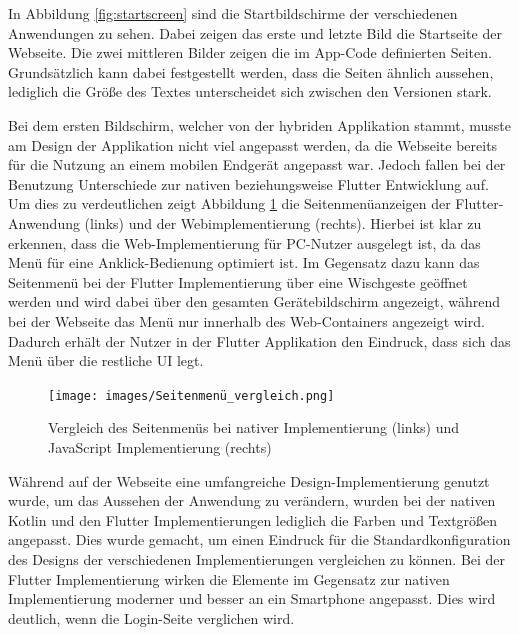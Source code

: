 In Abbildung \ref{fig:startscreen} sind die Startbildschirme der verschiedenen Anwendungen zu sehen. Dabei zeigen das erste und letzte Bild die Startseite der Webseite. Die zwei mittleren Bilder zeigen die im App-Code definierten Seiten. Grundsätzlich kann dabei festgestellt werden, dass die Seiten ähnlich aussehen, lediglich die Größe des Textes unterscheidet sich zwischen den Versionen stark.

Bei dem ersten Bildschirm, welcher von der hybriden Applikation stammt, musste am Design der Applikation nicht viel angepasst werden, da die Webseite bereits für die Nutzung an einem mobilen Endgerät angepasst war. Jedoch fallen bei der Benutzung Unterschiede zur nativen beziehungsweise Flutter Entwicklung auf. 
Um dies zu verdeutlichen zeigt Abbildung \ref{fig:sidemenu} die Seitenmenüanzeigen der Flutter-Anwendung (links) und der Webimplementierung (rechts). Hierbei ist klar zu erkennen, dass die Web-Implementierung für PC-Nutzer ausgelegt ist, da das Menü für eine Anklick-Bedienung optimiert ist. 
Im Gegensatz dazu kann das Seitenmenü bei der Flutter Implementierung über eine Wischgeste geöffnet werden und wird dabei über den gesamten Gerätebildschirm angezeigt, während bei der Webseite das Menü nur innerhalb des Web-Containers angezeigt wird. Dadurch erhält der Nutzer in der Flutter Applikation den Eindruck, dass sich das Menü über die restliche UI legt. 
\begin{figure}[ht]
  \centering
  \texttt{[image: images/Seitenmenü\_vergleich.png]} 
  \caption[Vergleich des Seitenmenüs der nativen und hybriden Applikation]{Vergleich des Seitenmenüs bei nativer Implementierung (links) und JavaScript Implementierung (rechts)}
  \label{fig:sidemenu}
\end{figure}

Während auf der Webseite eine umfangreiche Design-Implementierung genutzt wurde, um das Aussehen der Anwendung zu verändern, wurden bei der nativen Kotlin und den Flutter Implementierungen lediglich die Farben und Textgrößen angepasst. Dies wurde gemacht, um einen Eindruck für die Standardkonfiguration des Designs der verschiedenen Implementierungen vergleichen zu können. Bei der Flutter Implementierung wirken die Elemente im Gegensatz zur nativen Implementierung moderner und besser an ein Smartphone angepasst. Dies wird deutlich, wenn die Login-Seite verglichen wird.

